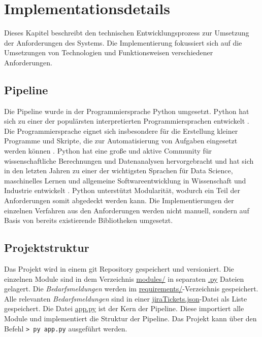 \section{Implementationsdetails}
Dieses Kapitel beschreibt den technischen Entwicklungsprozess zur Umsetzung der Anforderungen des Systems. Die Implementierung fokussiert sich auf die Umsetzungen von Technologien und Funktionsweisen verschiedener Anforderungen. %
\subsection{Pipeline}
Die Pipeline wurde in der Programmiersprache Python umgesetzt. Python hat sich zu einer der populärsten interpretierten Programmiersprachen entwickelt \cite{mckinney2012python}. Die Programmiersprache eignet sich insbesondere für die Erstellung kleiner Programme und Skripte, die zur Automatisierung von Aufgaben eingesetzt werden können \cite{mckinney2012python}. Python hat eine große und aktive Community für wissenschaftliche Berechnungen und Datenanalysen hervorgebracht und hat sich in den letzten Jahren zu einer der wichtigsten Sprachen für Data Science, maschinelles Lernen und allgemeine Softwareentwicklung in Wissenschaft und Industrie entwickelt \cite{mckinney2012python}. Python unterstützt Modularität, wodurch ein Teil der Anforderungen somit abgedeckt werden kann. Die Implementierungen der einzelnen Verfahren aus den Anforderungen werden nicht manuell, sondern auf Basis von bereits existierende Bibliotheken umgesetzt.
\subsection{Projektstruktur}
\label{sec:projektstruktur}
Das Projekt wird in einem git Repository gespeichert und versioniert. %
Die einzelnen Module sind in dem Verzeichnis \url{modules/} in separaten \url{.py} Dateien gelagert. Die \emph{Bedarfsmeldungen} werden im \url{requirements/}-Verzeichnis gespeichert. Alle relevanten \emph{Bedarfsmeldungen} sind in einer \url{jiraTickets.json}-Datei als Liste gespeichert. Die Datei \url{app.py} ist der Kern der Pipeline. Diese importiert alle Module und implementiert die Struktur der Pipeline. Das Projekt kann über den Befehl \lstinline{> py app.py} ausgeführt werden.
